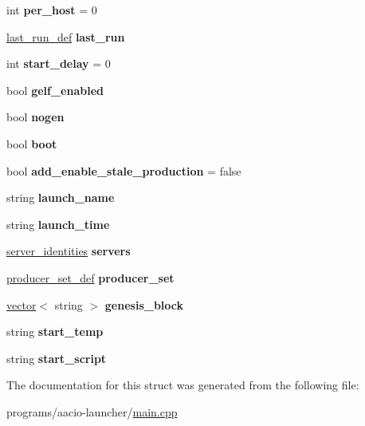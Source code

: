 \begin{DoxyCompactItemize}
int {\bfseries per\+\_\+host} = 0
\item 
\mbox{\label{structlauncher__def_a20a69a397eb7c4cfb9166cea27cbb1fa}} 
\mbox{\hyperlink{structlast__run__def}{last\+\_\+run\+\_\+def}} {\bfseries last\+\_\+run}
\item 
\mbox{\label{structlauncher__def_a6c58a0e1a0421daa55d74370e06ff5fe}} 
int {\bfseries start\+\_\+delay} = 0
\item 
\mbox{\label{structlauncher__def_a8bbf6008adfb2850afdddf8444807e10}} 
bool {\bfseries gelf\+\_\+enabled}
\item 
\mbox{\label{structlauncher__def_a53c7494c73df6abd6c13d36f407aef12}} 
bool {\bfseries nogen}
\item 
\mbox{\label{structlauncher__def_a1bec49ec7a5ba6c2b427a0f8a0099f92}} 
bool {\bfseries boot}
\item 
\mbox{\label{structlauncher__def_af9a99d83ac2a21b57fb0bc8cc93307fa}} 
bool {\bfseries add\+\_\+enable\+\_\+stale\+\_\+production} = false
\item 
\mbox{\label{structlauncher__def_a666bcc5ca7db69c6cb12e6647b9788c2}} 
string {\bfseries launch\+\_\+name}
\item 
\mbox{\label{structlauncher__def_ae73a438801909c3eac0d8c0900bab099}} 
string {\bfseries launch\+\_\+time}
\item 
\mbox{\label{structlauncher__def_ad5791a913cbe9309f08d1775113c8457}} 
\mbox{\hyperlink{structserver__identities}{server\+\_\+identities}} {\bfseries servers}
\item 
\mbox{\label{structlauncher__def_a0eb0238ea646d3e4d13f4a53b3e91b35}} 
\mbox{\hyperlink{structproducer__set__def}{producer\+\_\+set\+\_\+def}} {\bfseries producer\+\_\+set}
\item 
\mbox{\label{structlauncher__def_ae7dfe640d7baa64b85d6e0e170c214a7}} 
\mbox{\hyperlink{classstd_1_1vector}{vector}}$<$ string $>$ {\bfseries genesis\+\_\+block}
\item 
\mbox{\label{structlauncher__def_a826f6196994c1d7e638fc28ac6cc1b87}} 
string {\bfseries start\+\_\+temp}
\item 
\mbox{\label{structlauncher__def_abf494e2174d7e02f7ffbd13b88548135}} 
string {\bfseries start\+\_\+script}
\end{DoxyCompactItemize}


The documentation for this struct was generated from the following file\+:\begin{DoxyCompactItemize}
\item 
programs/aacio-\/launcher/\mbox{\hyperlink{programs_2aacio-launcher_2main_8cpp}{main.\+cpp}}\end{DoxyCompactItemize}
